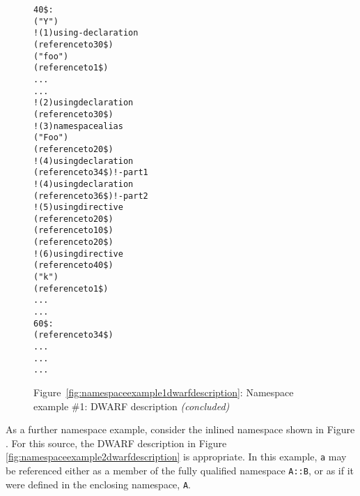 \begin{figure}
\begin{dwflisting}
\begin{alltt}
40\$: \DWTAGnamespace
        \DWATname("Y")
        \DWTAGimporteddeclaration            ! (1) using-declaration
            \DWATimport(reference to 30\$)
        \DWTAGvariable
            \DWATname("foo")
            \DWATtype(reference to 1\$)
            \DWATlocation ...
            ...
     \DWTAGimporteddeclaration               ! (2) using declaration
        \DWATimport(reference to 30\$)
        \DWTAGimporteddeclaration            ! (3) namespace alias
            \DWATname("Foo")
            \DWATimport(reference to 20\$)
        \DWTAGimporteddeclaration            ! (4) using declaration
            \DWATimport(reference to 34\$)     !     - part 1
        \DWTAGimporteddeclaration            ! (4) using declaration
            \DWATimport(reference to 36\$)     !     - part 2
        \DWTAGimportedmodule                 ! (5) using directive
            \DWATimport(reference to 20\$)
        \DWTAGnamespace
            \DWATextension(reference to 10\$)
            \DWTAGnamespace
                \DWATextension(reference to 20\$)
                \DWTAGimportedmodule         ! (6) using directive
                    \DWATimport(reference to 40\$)
                \DWTAGvariable
                    \DWATname("k")
                    \DWATtype(reference to 1\$)
                    \DWATlocation ...
                    ...
60\$: \DWTAGsubprogram
        \DWATspecification(reference to 34\$)
        \DWATlowpc ...
        \DWAThighpc ...
        ...
\end{alltt}
\end{dwflisting}
\begin{center}
\vspace{3mm}
Figure~\ref{fig:namespaceexample1dwarfdescription}: Namespace example \#1: DWARF description \textit{(concluded)}
\end{center}
\end{figure}

\clearpage
As a further namespace example, consider the inlined namespace shown in
Figure . For this source,
the DWARF description in Figure \ref{fig:namespaceexample2dwarfdescription}
is appropriate. In this example, \texttt{a} may be referenced either as a member of 
the fully qualified namespace \texttt{A::B}, or as if it were defined
in the enclosing namespace, \texttt{A}.

